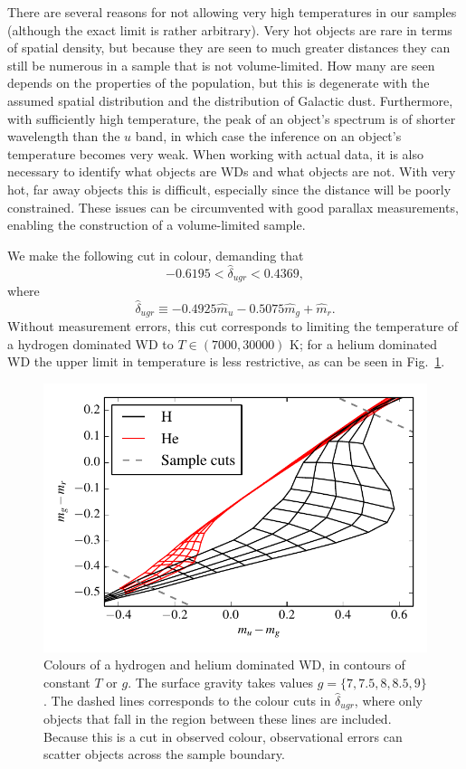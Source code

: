 \documentclass[fleqn,usenatbib]{mnras}
\newcommand{\Teff}{T}
\newcommand{\logg}{g}
\begin{document}
There are several reasons for not allowing very high temperatures in our samples (although the exact limit is rather arbitrary). Very hot objects are rare in terms of spatial density, but because they are seen to much greater distances they can still be numerous in a sample that is not volume-limited. How many are seen depends on the properties of the population, but this is degenerate with the assumed spatial distribution and the distribution of Galactic dust. Furthermore, with sufficiently high temperature, the peak of an object's spectrum is of shorter wavelength than the $u$ band, in which case the inference on an object's temperature becomes very weak. When working with actual data, it is also necessary to identify what objects are WDs and what objects are not. With very hot, far away objects this is difficult, especially since the distance will be poorly constrained. These issues can be circumvented with good parallax measurements, enabling the construction of a volume-limited sample.

We make the following cut in colour, demanding that
\begin{equation}
	-0.6195 < \hat{\delta}_{ugr} < 0.4369,
\end{equation}
where
\begin{equation}
	\hat{\delta}_{ugr} \equiv -0.4925\hat{m}_u-0.5075\hat{m}_g+\hat{m}_r.
\end{equation}
Without measurement errors, this cut corresponds to limiting the temperature of a hydrogen dominated WD to $\Teff \in (7000,30000)$ K; for a helium dominated WD the upper limit in temperature is less restrictive, as can be seen in Fig.~\ref{fig:colors_cut}.

\begin{figure}
	\includegraphics[width=\columnwidth]{colors_cut.pdf}
    \caption{Colours of a hydrogen and helium dominated WD, in contours of constant $\Teff$ or $\logg$. The surface gravity takes values $\logg = \{7,7.5,8,8.5,9\}$. The dashed lines corresponds to the colour cuts in $\hat{\delta}_{ugr}$, where only objects that fall in the region between these lines are included. Because this is a cut in observed colour, observational errors can scatter objects across the sample boundary.}
    \label{fig:colors_cut}
\end{figure}
\end{document}
